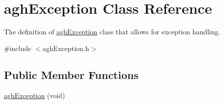 \hypertarget{classaghException}{\section{agh\-Exception \-Class \-Reference}
\label{classaghException}
}


\-The definition of \hyperlink{classaghException}{agh\-Exception} class that allows for exception handling.  




{\ttfamily \#include $<$agh\-Exception.\-h$>$}

\subsection*{\-Public \-Member \-Functions}
\begin{DoxyCompactItemize}
\item 
\hypertarget{classaghException_a4823634f8bfb0fe7338b49f0e26fc90a}{\hyperlink{classaghException_a4823634f8bfb0fe7338b49f0e26fc90a}{agh\-Exception} (void)}\label{classaghException_a4823634f8bfb0fe7338b49f0e26fc90a}


\end{DoxyCompactItemize}
